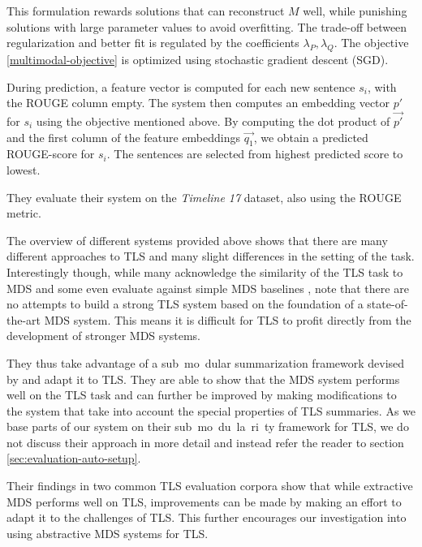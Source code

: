 \documentclass[a4paper,BCOR=10mm]{report}
\numberwithin{lemma}{chapter}
\numberwithin{definition}{chapter}
\begin{document}
This formulation rewards solutions that can reconstruct $M$ well, while punishing solutions with large parameter values to avoid overfitting. The trade-off between regularization and better fit is regulated by the coefficients $\lambda_P, \lambda_Q$.
The objective \ref{multimodal-objective} is optimized using stochastic gradient descent (SGD).

During prediction, a feature vector is computed for each new sentence $s_i$, with the ROUGE column empty. The system then computes an embedding vector $p'$ for $s_i$ using the objective mentioned above. By computing the dot product of $\vec{p'}$ and the first column of the feature embeddings $\vec{q_1}$, we obtain a predicted ROUGE-score for $s_i$.
The sentences are selected from highest predicted score to lowest.

They evaluate their system on the \textit{Timeline 17} dataset, also using the ROUGE metric.


The overview of different systems provided above shows that there are many different approaches to TLS and many slight differences in the setting of the task. Interestingly though, while many acknowledge the similarity of the TLS task to MDS \citep{yan-trans, tran-headlines} and some even evaluate against simple MDS baselines \citep{yan-trans}, \citet{markert} note that there are no attempts to build a strong TLS system based on the foundation of a state-of-the-art MDS system. This means it is difficult for TLS to profit directly from the development of stronger MDS systems.

They thus take advantage of a sub~mo~dular summarization framework devised by \citet{lin+bilmes} and adapt it to TLS.
They are able to show that the MDS system performs well on the TLS task and can further be improved by making modifications to the system that take into account the special properties of TLS summaries.
As we base parts of our system on their sub~mo~du~la~ri~ty framework for TLS, we do not discuss their approach in more detail and instead refer the reader to section \ref{sec:evaluation-auto-setup}.

Their findings in two common TLS evaluation corpora show that while extractive MDS performs well on TLS, improvements can be made by making an effort to adapt it to the challenges of TLS.
This further encourages our investigation into using abstractive MDS systems for TLS.

\end{document}
